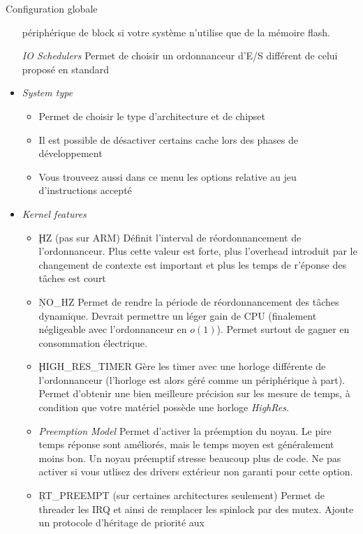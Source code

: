 \begin{frame}[fragile=singleslide]{Configuration globale}
\begin{itemize}
    périphérique de block si votre système n'utilise que de la mémoire
    flash.
    \begin{itemize} 
      \emph{IO  Schedulers} Permet  de choisir  un  ordonnanceur d'E/S
      différent de celui proposé en standard
    \end{itemize} 
  \item \emph{System type}
    \begin{itemize} 
    \item Permet de choisir le type d'architecture et de chipset
    \item Il est possible de désactiver certains cache lors des phases
      de développement
    \item Vous trouveez aussi dans ce menu les options relative au jeu
      d'instructions accepté
    \end{itemize}
  \item \emph{Kernel features}
    \begin{itemize} 
    \item \c{HZ} (pas sur  ARM) Définit l'interval de réordonnancement
      de l'ordonnanceur.  Plus cette valeur est forte, plus l'overhead
      introduit par  le changement de  contexte est important  et plus
      les temps de r'éponse des tâches est court
    \item \c{NO_HZ}  Permet de  rendre la période  de réordonnancement
      des  tâches dynamique. Devrait  permettre un  léger gain  de CPU
      (finalement négligeable  avec l'ordonnanceur en  $o(1)$). Permet
      surtout de gagner en consommation électrique.
    \item   \c{HIGH_RES_TIMER}  Gère  les   timer  avec   une  horloge
      différente de l'ordonnanceur (l'horloge  est alors géré comme un
      périphérique  à  part).  Permet  d'obtenir  une  bien  meilleure
      précision  sur  les  mesure  de  temps, à  condition  que  votre
      matériel possède une horloge \emph{HighRes}.
    \item  \emph{Preemption Model} Permet  d'activer la  préemption du
      noyau. Le pire temps réponse sont améliorés, mais le temps moyen
      est généralement moins bon.  Un noyau préemptif stresse beaucoup
      plus  de code.   Ne  pas  activer si  vous  utlisez des  drivers
      extérieur non garanti pour cette option.
    \item  \c{RT_PREEMPT}   (sur  certaines  architectures  seulement)
      Permet de  threader les IRQ  et ainsi de remplacer  les spinlock
      par des  mutex.  Ajoute un protocole d'héritage  de priorité aux

\end{itemize}
\end{itemize}
\end{frame}
